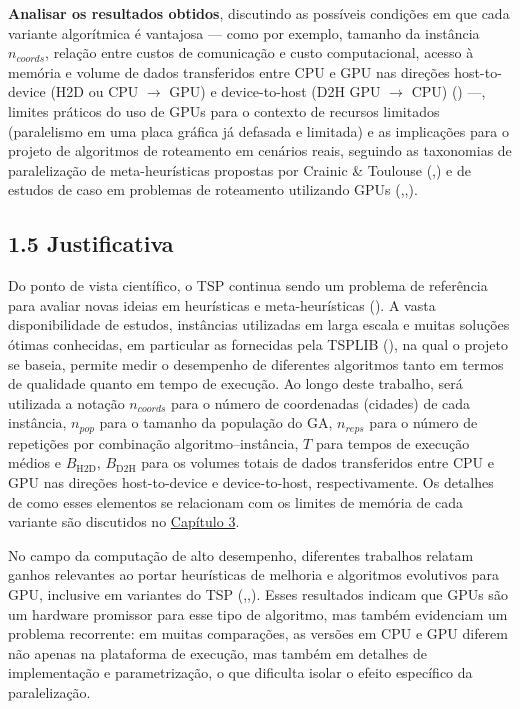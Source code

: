 \begin{enumerate}
  \textbf{Analisar os resultados obtidos}, discutindo as possíveis
  condições em que cada variante algorítmica é vantajosa --- como por
  exemplo, tamanho da instância \(n_{coords}\), relação entre custos de
  comunicação e custo computacional, acesso à memória e volume de dados
  transferidos entre CPU e GPU nas direções host-to-device (H2D ou CPU
  \(\to\) GPU) e device-to-host (D2H GPU \(\to\) CPU)
  () ---, limites práticos do uso de
  GPUs para o contexto de recursos limitados (paralelismo em uma placa
  gráfica já defasada e limitada) e as implicações para o projeto de
  algoritmos de roteamento em cenários reais, seguindo as taxonomias de
  paralelização de meta-heurísticas propostas por Crainic \& Toulouse
  (,)
  e de estudos de caso em problemas de roteamento utilizando GPUs
  (,,).
\end{enumerate}

\subsection{1.5 Justificativa}\label{sec-15-justificativa}

Do ponto de vista científico, o TSP continua sendo um problema de
referência para avaliar novas ideias em heurísticas e meta-heurísticas
(). A vasta disponibilidade de estudos,
instâncias utilizadas em larga escala e muitas soluções ótimas
conhecidas, em particular as fornecidas pela TSPLIB
(), na qual o projeto se baseia,
permite medir o desempenho de diferentes algoritmos tanto em termos de
qualidade quanto em tempo de execução. Ao longo deste trabalho, será
utilizada a notação \(n_{coords}\) para o número de coordenadas
(cidades) de cada instância, \(n_{pop}\) para o tamanho da população do
GA, \(n_{reps}\) para o número de repetições por combinação
algoritmo--instância, \(T\) para tempos de execução médios e
\(B_{\mathrm{H2D}}\), \(B_{\mathrm{D2H}}\) para os volumes totais de
dados transferidos entre CPU e GPU nas direções host-to-device e
device-to-host, respectivamente. Os detalhes de como esses elementos se
relacionam com os limites de memória de cada variante são discutidos no
\hyperref[cap3-materiais-metodos]{Capítulo 3}.

No campo da computação de alto desempenho, diferentes trabalhos relatam
ganhos relevantes ao portar heurísticas de melhoria e algoritmos
evolutivos para GPU, inclusive em variantes do TSP
(,,).
Esses resultados indicam que GPUs são um hardware promissor para esse
tipo de algoritmo, mas também evidenciam um problema recorrente: em
muitas comparações, as versões em CPU e GPU diferem não apenas na
plataforma de execução, mas também em detalhes de implementação e
parametrização, o que dificulta isolar o efeito específico da
paralelização.

